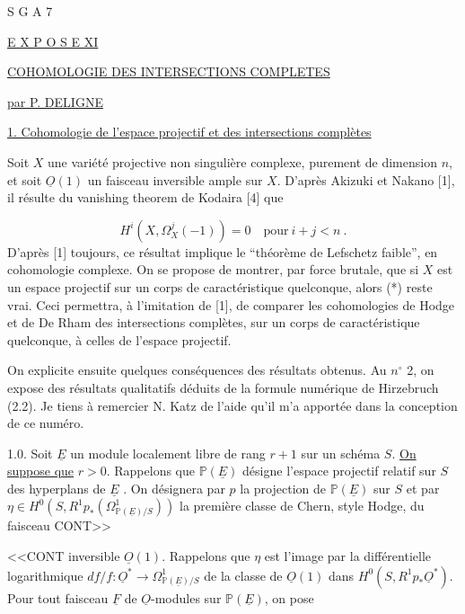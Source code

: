 


S G A 7


\underline{E X P O S E  XI}


\underline{COHOMOLOGIE DES INTERSECTIONS COMPLETES}


\underline{par P. DELIGNE}


\underline{1. Cohomologie de l'espace projectif et des intersections compl\`etes}

Soit $X$ une vari\'et\'e projective non singuli\`ere complexe, purement de dimension $n$, et soit $\underline{O}(1)$ un faisceau inversible ample sur $X$. D'apr\`es Akizuki et Nakano [1], il r\'esulte du vanishing theorem de Kodaira [4] que

\begin{equation}\tag{*}
H^i(X,\Omega^j_X (-1)) = 0 \quad \mathrm{pour}\ i+j < n \ .
\end{equation}
D'apr\`es [1] toujours, ce r\'esultat implique le ``th\'eor\`eme de Lefschetz faible'', en cohomologie complexe. On se propose de montrer, par force brutale, que si $X$ est un espace projectif sur un corps de caract\'eristique quelconque, alors (*) reste vrai. Ceci permettra, \`a l'imitation de [1], de comparer les cohomologies de Hodge et de De Rham des intersections compl\`etes, sur un corps de caract\'eristique quelconque, \`a celles de l'espace projectif.

On explicite ensuite quelques cons\'equences des r\'esultats obtenus. Au $n^{\circ}$ 2, on expose des r\'esultats qualitatifs d\'eduits de la formule num\'erique de Hirzebruch (2.2). Je tiens \`a remercier N. Katz de l'aide qu'il m'a apport\'ee dans la conception de ce num\'ero.

1.0. Soit $\underline{E}$ un module localement libre de rang $r+1$ sur un sch\'ema $S$. \underline{On suppose que} $r > 0$. Rappelons que $\mathbb{P}(\underline{E})$ d\'esigne l'espace projectif relatif sur $S$ des hyperplans de $\underline{E}$ . On d\'esignera par $p$ la projection de $\mathbb{P}(\underline{E})$ sur $S$ et par $\eta \in H^0(S,R^1 p_*(\Omega^1_{\mathbb{P}(\underline{E})/S}))$ la premi\`ere classe de Chern, style Hodge, du faisceau CONT>>



<<CONT inversible $\underline{O}(1)$. Rappelons que $\eta$ est l'image par la diff\'erentielle logarithmique $df/f : \underline{O}^* \longrightarrow \Omega^1_{\mathbb{P}(\underline{E})/S}$ de la classe de $\underline{O}(1)$ dans $H^0(S,R^1 p_* \underline{O}^*)$. Pour tout faisceau $\underline{F}$ de $\underline{O}$-modules sur $\mathbb{P}(\underline{E})$, on pose

